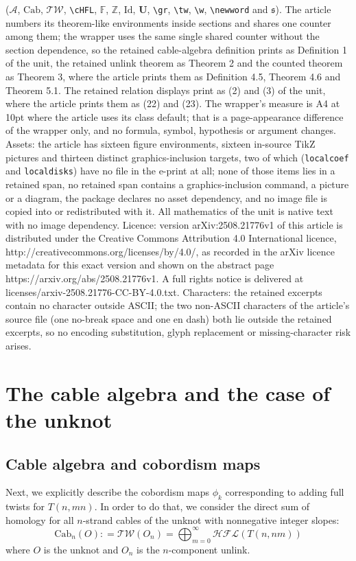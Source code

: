 \documentclass[10pt,a4paper]{amsart}
\theoremstyle{plain}
\newcommand{\CA}{\mathcal{A}}
\newcommand{\Cab}{\mathrm{Cab}}
\newcommand{\Tw}{\mathcal{TW}}
\newcommand{\cHFL}{\mathcal{H\!F\! L}}
\newcommand{\F}{\mathbb{F}}
\newcommand{\Z}{\mathbb{Z}}
\newcommand{\Id}{\mathrm{Id}}
\newcommand{\UU}{\mathbf{U}}
\begin{document}
($\CA$, $\Cab$, $\Tw$, \texttt{\textbackslash cHFL}, $\F$, $\Z$, $\Id$, $\UU$, \texttt{\textbackslash gr}, \texttt{\textbackslash tw}, \texttt{\textbackslash w}, \texttt{\textbackslash newword} and $\mathfrak{s}$). The article numbers its theorem-like environments inside sections and shares one counter among them; the wrapper uses the same single shared counter without the section dependence, so the retained cable-algebra definition prints as Definition 1 of the unit, the retained unlink theorem as Theorem 2 and the counted theorem as Theorem 3, where the article prints them as Definition 4.5, Theorem 4.6 and Theorem 5.1. The retained relation displays print as (2) and (3) of the unit, where the article prints them as (22) and (23). The wrapper's measure is A4 at 10pt where the article uses its class default; that is a page-appearance difference of the wrapper only, and no formula, symbol, hypothesis or argument changes. Assets: the article has sixteen figure environments, sixteen in-source TikZ pictures and thirteen distinct graphics-inclusion targets, two of which (\texttt{localcoef} and \texttt{localdisks}) have no file in the e-print at all; none of those items lies in a retained span, no retained span contains a graphics-inclusion command, a picture or a diagram, the package declares no asset dependency, and no image file is copied into or redistributed with it. All mathematics of the unit is native text with no image dependency. Licence: version arXiv:2508.21776v1 of this article is distributed under the Creative Commons Attribution 4.0 International licence, http://creativecommons.org/licenses/by/4.0/, as recorded in the arXiv licence metadata for this exact version and shown on the abstract page https://arxiv.org/abs/2508.21776v1. A full rights notice is delivered at licenses/arxiv-2508.21776-CC-BY-4.0.txt. Characters: the retained excerpts contain no character outside ASCII; the two non-ASCII characters of the article's source file (one no-break space and one en dash) both lie outside the retained excerpts, so no encoding substitution, glyph replacement or missing-character risk arises.
\section{The cable algebra and the case of the unknot}
\subsection{Cable algebra and cobordism maps} Next, we explicitly describe the cobordism maps $\phi_k$ corresponding to adding full twists  for $T(n,mn)$. In order to do that, we consider the direct sum of homology for all $n$-strand cables of the unknot with nonnegative integer slopes:
\begin{equation}\label{eq:CabU}
\Cab_n(O): =\Tw(O_n)=\bigoplus_{m=0}^{\infty}\cHFL(T(n,nm))
\end{equation}
where $O$ is the unknot and  $O_n$ is the $n$-component unlink. 
\end{document}
